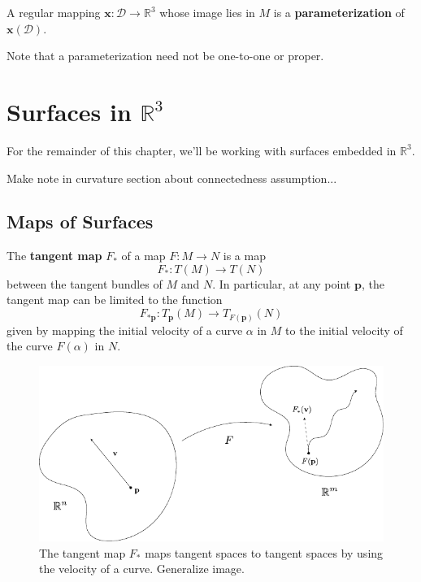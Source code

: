 \documentclass[twoside,10pt]{report}
\begin{document}
\begin{defn}[]
	A regular mapping $\mathbf{x}:\mathcal{D}\to \mathbb{R}^3$ whose image lies in $M$ is a \textbf{parameterization} of $\mathbf{x}(\mathcal{D})$.
\end{defn}

Note that a parameterization need not be one-to-one or proper.


\chapter{Surfaces in \texorpdfstring{$\mathbb{R}^3$}{R3}}

\begin{note}[]
For the remainder of this chapter, we'll be working with surfaces embedded in $\mathbb{R}^3$.
\end{note}

{\color{red}Make note in curvature section about connectedness assumption...}


\section{Maps of Surfaces}

\begin{defn}
The \textbf{tangent map} $F_*$ of a map $F:M\to N$ is a map
\[
	F_* : T(M) \to T(N)
\] between the tangent bundles of $M$ and $N$. In particular, at any point $\mathbf{p}$, the tangent map can be limited to the function
\[
	F_{*\mathbf{p}}:T_{\mathbf{p}}(M)\to T_{F(\mathbf{p})}(N)
\]
given by mapping the initial velocity of a curve $\alpha$ in $M$ to the initial velocity of the curve $F(\alpha)$ in $N$.
\end{defn}

\begin{figure}[H]
	\centering
	\includegraphics[scale=1]{fig/tan-map.pdf}
	\caption{The tangent map $F_*$ maps tangent spaces to tangent spaces by using the velocity of a curve. {\color{red}Generalize image.}}
\end{figure}
\end{document}
